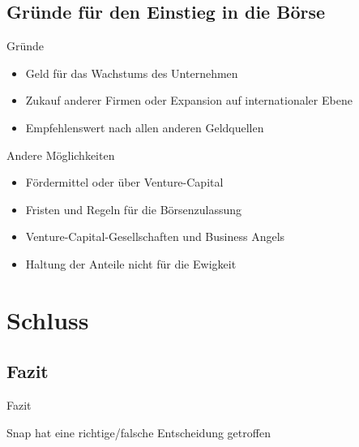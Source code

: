 \documentclass{beamer}
\begin{document}
\subsection{Gründe für den Einstieg in die Börse}
\begin{frame} {Gründe}
\begin{itemize}
\item Geld für das Wachstums des Unternehmen  \pause
\item Zukauf anderer Firmen oder Expansion auf internationaler Ebene   \pause
\item Empfehlenswert nach allen anderen Geldquellen   \pause
\end{itemize}
\end{frame}
\begin{frame} {Andere Möglichkeiten}
\begin{itemize}
\item Fördermittel oder über Venture-Capital 
\item Fristen und Regeln für die Börsenzulassung
\item Venture-Capital-Gesellschaften und Business Angels
\item Haltung der Anteile nicht für die Ewigkeit
\end{itemize}
\end{frame}



\section{Schluss}
\subsection{Fazit}
\begin{frame}{Fazit}

Snap hat eine richtige/falsche Entscheidung getroffen

\end{frame}
\end{document}
